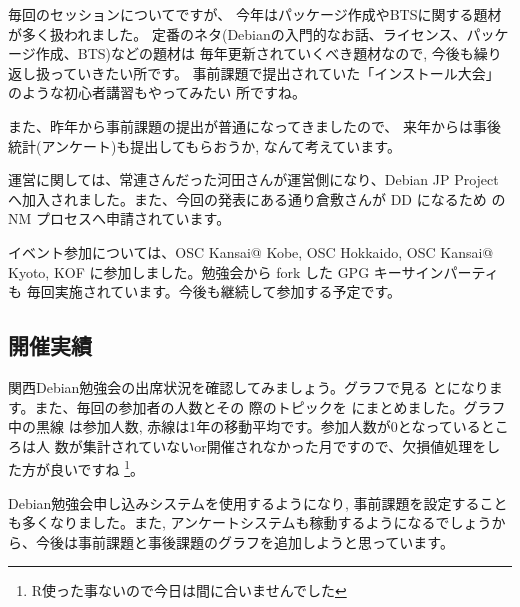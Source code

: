 \documentclass[mingoth,a4paper]{jsarticle}
\begin{document}
毎回のセッションについてですが、
今年はパッケージ作成やBTSに関する題材が多く扱われました。
定番のネタ(Debianの入門的なお話、ライセンス、パッケージ作成、BTS)などの題材は
毎年更新されていくべき題材なので, 今後も繰り返し扱っていきたい所です。
事前課題で提出されていた「インストール大会」のような初心者講習もやってみたい
所ですね。

また、昨年から事前課題の提出が普通になってきましたので、
来年からは事後統計(アンケート)も提出してもらおうか, なんて考えています。

運営に関しては、常連さんだった河田さんが運営側になり、Debian JP Project
へ加入されました。また、今回の発表にある通り倉敷さんが DD になるため
の NM プロセスへ申請されています。

イベント参加については、OSC Kansai@ Kobe, OSC Hokkaido, OSC Kansai@
Kyoto, KOF に参加しました。勉強会から fork した GPG キーサインパーティも
毎回実施されています。今後も継続して参加する予定です。

\subsection{開催実績}

関西Debian勉強会の出席状況を確認してみましょう。グラフで見る
とになります。また、毎回の参加者の人数とその
際のトピックを  にまとめました。グラフ中の黒線
は参加人数, 赤線は1年の移動平均です。参加人数が$0$となっているところは人
数が集計されていないor開催されなかった月ですので、欠損値処理をした方が良いですね%
\footnote{R使った事ないので今日は間に合いませんでした}。

Debian勉強会申し込みシステムを使用するようになり, 事前課題を設定すること
も多くなりました。また, アンケートシステムも稼動するようになるでしょうか
ら、今後は事前課題と事後課題のグラフを追加しようと思っています。
\end{document}
